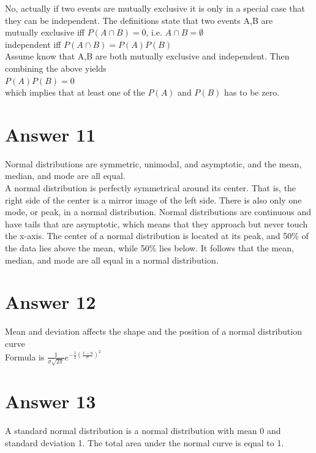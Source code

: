 \documentclass[12pt]{article}
\begin{document}
No, actually if two events are mutually exclusive it is only in a special case that they can be independent. The definitions state that two events A,B are\\
mutually exclusive iff $P(A \cap B) = 0$, i.e. $A \cap B = \emptyset$ \\
independent iff $P(A \cap B) = P(A)P(B)$ \\
Assume know that A,B are both mutually exclusive and independent. Then combining the above yields \\
$P(A)P(B)=0$\\
which implies that at least one of the $P(A)$ and $P(B)$ has to be zero.\\

\section*{Answer 11}

Normal distributions are symmetric, unimodal, and asymptotic, and the mean, median, and mode are all equal.\\

A normal distribution is perfectly symmetrical around its center. That is, the right side of the center is a mirror image of the left side. There is also only one mode, or peak, in a normal distribution. Normal distributions are continuous and have tails that are asymptotic, which means that they approach but never touch the x-axis. The center of a normal distribution is located at its peak, and 50\% of the data lies above the mean, while 50\% lies below. It follows that the mean, median, and mode are all equal in a normal distribution. \\

\section*{Answer 12}

Mean and deviation affects the shape and the position of a normal distribution curve \\

Formula is $\frac{1}{\sigma \sqrt{2 \pi}} e^{- \frac{1}{2} {(\frac{x-u}{\sigma})}^2}$

\section*{Answer 13}

A standard normal distribution is a normal distribution with mean 0 and standard deviation 1. The total area under the normal curve is equal to 1.\\
\end{document}

